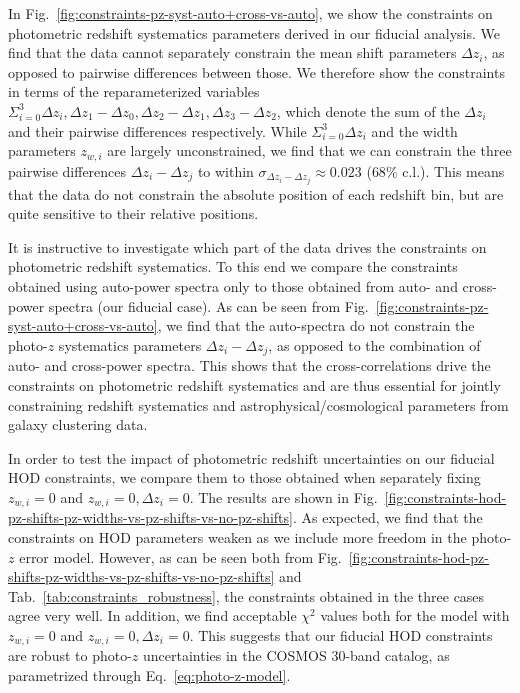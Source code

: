 \documentclass[a4paper,11pt]{article}
\begin{document}
      In Fig.~\ref{fig:constraints-pz-syst-auto+cross-vs-auto}, we show the constraints on photometric redshift systematics parameters derived in our fiducial analysis. We find that the data cannot separately constrain the mean shift parameters $\Delta z_{i}$, as opposed to pairwise differences between those. We therefore show the constraints in terms of the reparameterized variables $\Sigma_{i=0}^{3} \Delta z_{i}, \Delta z_{1} - \Delta z_{0}, \Delta z_{2} - \Delta z_{1}, \Delta z_{3} - \Delta z_{2}$, which denote the sum of the $\Delta z_{i}$ and their pairwise differences respectively. While $\Sigma_{i=0}^{3} \Delta z_{i}$ and the width parameters $z_{w, i}$ are largely unconstrained, we find that we can constrain the three pairwise differences $\Delta z_{i} - \Delta z_{j}$ to within $\sigma_{\Delta z_{i} - \Delta z_{j}} \approx 0.023$ ($68 \%$ c.l.). This means that the data do not constrain the absolute position of each redshift bin, but are quite sensitive to their relative positions.

      It is instructive to investigate which part of the data drives the constraints on photometric redshift systematics. To this end we compare the constraints obtained using auto-power spectra only to those obtained from auto- and cross-power spectra (our fiducial case). As can be seen from Fig.~\ref{fig:constraints-pz-syst-auto+cross-vs-auto}, we find that the auto-spectra do not constrain the photo-$z$ systematics parameters $\Delta z_{i} - \Delta z_{j}$, as opposed to the combination of auto- and cross-power spectra. This shows that the cross-correlations drive the constraints on photometric redshift systematics and are thus essential for jointly constraining redshift systematics and astrophysical/cosmological parameters from galaxy clustering data.

      In order to test the impact of photometric redshift uncertainties on our fiducial HOD constraints, we compare them to those obtained when separately fixing $z_{w, i} = 0$ and $z_{w, i} = 0, \Delta z_{i} = 0$. The results are shown in Fig.~\ref{fig:constraints-hod-pz-shifts-pz-widths-vs-pz-shifts-vs-no-pz-shifts}. As expected, we find that the constraints on HOD parameters weaken as we include more freedom in the photo-$z$ error model. However, as can be seen both from Fig.~\ref{fig:constraints-hod-pz-shifts-pz-widths-vs-pz-shifts-vs-no-pz-shifts} and Tab.~\ref{tab:constraints_robustness}, the constraints obtained in the three cases agree very well. In addition, we find acceptable $\chi^{2}$ values both for the model with $z_{w, i} = 0$ and $z_{w, i} = 0, \Delta z_{i} = 0$. This suggests that our fiducial HOD constraints are robust to photo-$z$ uncertainties in the COSMOS 30-band catalog, as parametrized through Eq.~\ref{eq:photo-z-model}. 
\end{document}
